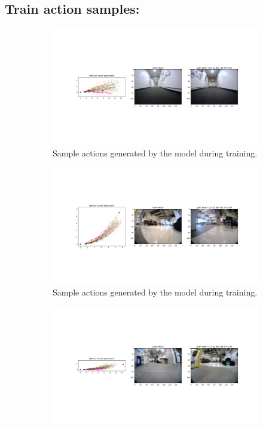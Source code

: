 \documentclass[12pt]{article}
\begin{document}
\subsection{Train action samples:}
\begin{figure}[H]
    \centering
    \begin{subfigure}[b]{0.48\textwidth}
        \centering
        \includegraphics[width=\textwidth]{images/train_action_samples_1.png}
        \caption{Sample actions generated by the model during training.}
        \label{fig:train_action_samples_1}
    \end{subfigure}
    \hfill
    \begin{subfigure}[b]{0.48\textwidth}
        \centering
        \includegraphics[width=\textwidth]{images/train_action_samples_2.png}
        \caption{Sample actions generated by the model during training.}
        \label{fig:train_action_samples_2}
    \end{subfigure}
    \hfill
    \begin{subfigure}[b]{0.48\textwidth}
        \centering
        \includegraphics[width=\textwidth]{images/train_action_samples_3.png}

\end{subfigure}
\end{figure}
\end{document}
